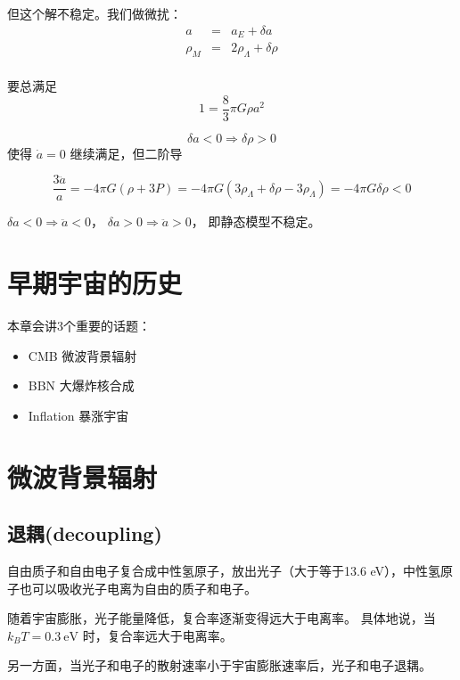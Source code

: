 \documentclass[12pt]{ctexart}
\begin{document}
但这个解不稳定。我们做微扰：
\begin{eqnarray}
    a&=&a_{E}+\delta a \\ 
    \rho_{M}&=&2 \rho_\Lambda+\delta \rho \\ 
\end{eqnarray}

要总满足
\begin{equation}
    1=\frac{8}{3} \pi G \rho a^{2}
\end{equation}

\begin{equation}
    \delta a<0 \Rightarrow \delta \rho>0 
\end{equation}
使得 $\dot{a}=0$ 继续满足，但二阶导

\begin{equation}
    \frac{3 \ddot{a}}{a}=-4 \pi G(\rho+3 P)=-4 \pi G\left(3 \rho_\Lambda+\delta \rho-3 \rho_\Lambda\right)=-4 \pi G \delta \rho<0
\end{equation}

$\delta a<0  \Rightarrow \ddot{a}<0$，
$\delta a>0  \Rightarrow \ddot{a}>0$，
即静态模型不稳定。


\section{早期宇宙的历史}

本章会讲3个重要的话题：
\begin{itemize}
    \item CMB 微波背景辐射
    \item BBN 大爆炸核合成
    \item Inflation 暴涨宇宙
\end{itemize}

\section{微波背景辐射}

\subsection{退耦(decoupling)}

自由质子和自由电子复合成中性氢原子，放出光子（大于等于13.6 eV），中性氢原子也可以吸收光子电离为自由的质子和电子。

随着宇宙膨胀，光子能量降低，复合率逐渐变得远大于电离率。
具体地说，当 $k_B T =0.3 \mathrm{~eV}$ 时，复合率远大于电离率。

另一方面，当光子和电子的散射速率小于宇宙膨胀速率后，光子和电子退耦。
\end{document}
